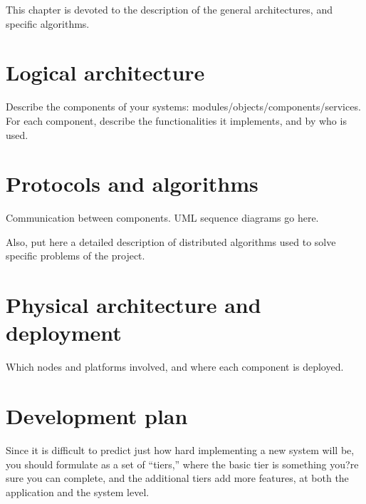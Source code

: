 \documentclass{memoir}
\begin{document}
\begin{figure}[h]
  \centering
\end{figure}

\newpage
This chapter is devoted to the description of the general architectures, and specific algorithms.

\section{Logical architecture}
Describe the components of your systems: modules/objects/components/services.
For each component, describe the functionalities it implements, and by who is used.


\section{Protocols and algorithms}
\label{sec:protalg}
Communication between components.  UML sequence diagrams go here.

Also, put here a detailed description of distributed algorithms used to solve specific problems of the project.

\section{Physical architecture and deployment}
Which nodes and platforms involved, and where each component is deployed.

\section{Development plan}
Since it is difficult to predict just how hard implementing a new system will be, you should formulate as a set of ``tiers,'' where the basic tier is something you?re sure you can complete, and the additional tiers add more features, at both the application and the system level.
\end{document}

